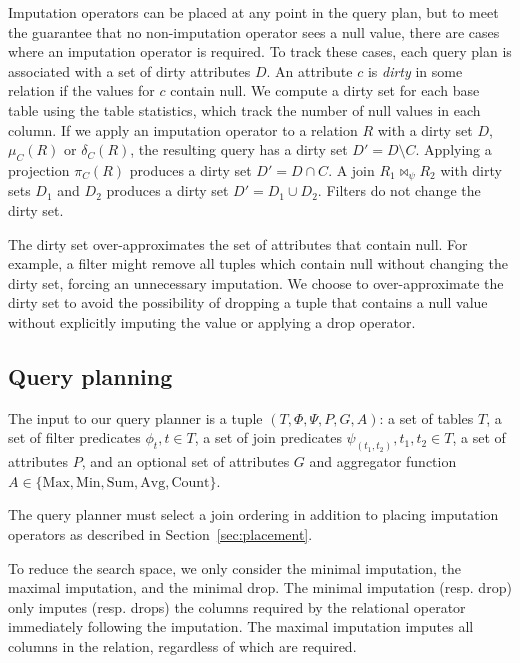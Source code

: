 Imputation operators can be placed at any point in the query plan, but to meet the guarantee that no non-imputation operator sees a null value, there are cases where an imputation operator is required. To track these cases, each query plan is associated with a set of dirty attributes $D$. An attribute $c$ is \emph{dirty} in some relation if the values for $c$ contain null. We compute a dirty set for each base table using the table statistics, which track the number of null values in each column. If we apply an imputation operator to a relation $R$ with a dirty set $D$, $\mu_C (R)$ or $\delta_C (R)$, the resulting query has a dirty set $D' = D \setminus C$.  Applying a projection $\pi_C(R)$ produces a dirty set $D' = D \cap C$. A join $R_1 \Join_\psi R_2$ with dirty sets $D_1$ and $D_2$  produces a dirty set $D' = D_1 \cup D_2$.  Filters do not change the dirty set. 

The dirty set over-approximates the set of attributes that contain null. For example, a filter might remove all tuples which contain null without changing the dirty set, forcing an unnecessary imputation. We choose to over-approximate the dirty set to avoid the possibility of dropping a tuple that contains a null value without explicitly imputing the value or applying a drop operator.

\subsection{Query planning}
The input to our query planner is a tuple $(T, \Phi, \Psi, P, G, A)$: a set of tables $T$, a set of filter predicates $\phi_t, t \in T$, a set of join predicates $\psi_(t_1, t_2), t_1, t_2 \in T$, a set of attributes $P$, and an optional set of attributes $G$ and aggregator function $A \in \{\text{Max}, \text{Min}, \text{Sum}, \text{Avg}, \text{Count}\}$.

The query planner must select a join ordering in addition to placing imputation operators as described in Section~\ref{sec:placement}.

To reduce the search space, we only consider the minimal imputation, the maximal imputation, and the minimal drop. The minimal imputation (resp. drop) only imputes (resp. drops) the columns required by the relational operator immediately following the imputation. The maximal imputation imputes all columns in the relation, regardless of which are required. 

